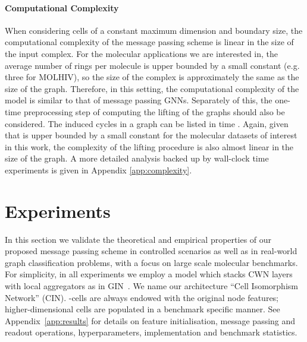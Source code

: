 \documentclass{article}
\begin{document}
\paragraph{Computational Complexity} When considering cells of a constant maximum dimension and boundary size, the computational complexity of the message passing scheme is linear in the size of the input complex. For the molecular applications we are interested in, the average number of rings per molecule is upper bounded by a small constant (e.g. three for MOLHIV), so the size of the complex is approximately the same as the size of the graph. Therefore, in this setting, the computational complexity of the model is similar to that of message passing GNNs. Separately of this, the one-time preprocessing step of computing the lifting of the graphs should also be considered. The  induced cycles in a graph can be listed in  time \citep{ferreira2014amortized}. Again, given that  is upper bounded by a small constant for the molecular datasets of interest in this work, the complexity of the lifting procedure is also almost linear in the size of the graph. A more detailed analysis backed up by wall-clock time experiments is given in Appendix \ref{app:complexity}.




\section{Experiments}
\label{sec:results}

In this section we validate the theoretical and empirical properties of our proposed message passing scheme in controlled scenarios as well as in real-world graph classification problems, with a focus on large scale molecular benchmarks. For simplicity, in all experiments we employ a model which stacks CWN layers with local aggregators as in GIN~\citep{GIN}. We name our architecture ``Cell Isomorphism Network'' (CIN). -cells are always endowed with the original node features; higher-dimensional cells are populated in a benchmark specific manner. See Appendix~\ref{app:results} for details on feature initialisation, message passing and readout operations, hyperparameters, implementation and benchmark statistics.
\end{document}
